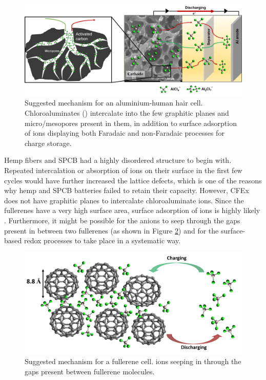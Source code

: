  \begin{figure}[h!]
  \centering
  \includegraphics[width=\textwidth]{Figures/chap5fig/achmech}
    \caption{Suggested mechanism for an aluminium-human hair cell. Chloroaluminates () intercalate into the few graphitic planes and micro/mesopores present in them, in addition to surface adsorption of ions displaying both Faradaic and non-Faradaic processes for charge storage.}
  \label{Figures/chap5fig:achmech}
\end{figure}

Hemp fibers and SPCB had a highly disordered structure to begin with. Repeated intercalation or absorption of ions on their surface in the first few cycles would have further increased the lattice defects, which is one of the reasons why hemp and SPCB batteries failed to retain their capacity. However, CFEx does not have graphitic planes to intercalate chloroaluminate ions. Since the fullerenes have a very high surface area, surface adsorption of ions is highly likely \cite{adams_van_1994}. Furthermore, it might be possible for the anions to seep through the gaps present in between two fullerenes (as shown in Figure \ref{Figures/chap5fig:cfexmech}) and for the surface-based redox processes to take place in a systematic way.

 \begin{figure}[tbh!]
  \centering
  \includegraphics[width=\textwidth]{Figures/chap5fig/cfexmech}
    \caption{Suggested mechanism for a fullerene cell.  ions seeping in through the gaps present between fullerene molecules.}
  \label{Figures/chap5fig:cfexmech}
\end{figure}

